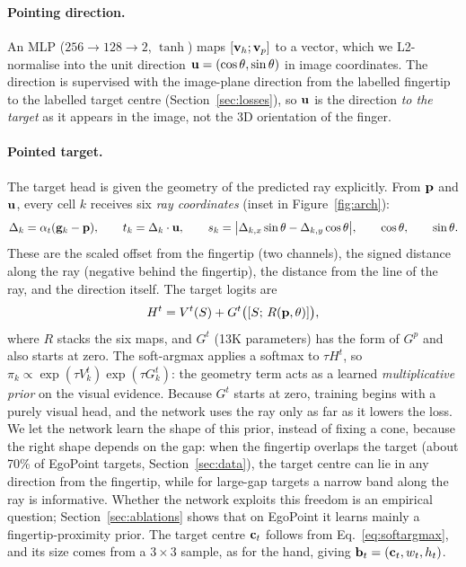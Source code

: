 \paragraph{Pointing direction.} An MLP ($256\to128\to2$, $\tanh$) maps $[\mathbf{v}_h;\mathbf{v}_p]$ to a vector, which we L2-normalise into the unit direction $\mathbf{u}=(\cos\theta,\sin\theta)$ in image coordinates. The direction is supervised with the image-plane direction from the labelled fingertip to the labelled target centre (Section~\ref{sec:losses}), so $\mathbf{u}$ is the direction \emph{to the target} as it appears in the image, not the 3D orientation of the finger.

\paragraph{Pointed target.} The target head is given the geometry of the predicted ray explicitly. From $\mathbf{p}$ and $\mathbf{u}$, every cell $k$ receives six \emph{ray coordinates} (inset in Figure~\ref{fig:arch}):
\begin{equation}
\Delta_k=\alpha_t(\mathbf{g}_k-\mathbf{p}),\qquad
t_k=\Delta_k\cdot\mathbf{u},\qquad
s_k=\big|\Delta_{k,x}\sin\theta-\Delta_{k,y}\cos\theta\big|,\qquad
\cos\theta,\qquad \sin\theta .
\label{eq:raycoords}
\end{equation}
These are the scaled offset from the fingertip (two channels), the signed distance along the ray (negative behind the fingertip), the distance from the line of the ray, and the direction itself. The target logits are
\begin{equation}
H^t = V^t(S) + G^t\big([S;\,R(\mathbf{p},\theta)]\big),
\label{eq:target}
\end{equation}
where $R$ stacks the six maps, and $G^t$ (13K parameters) has the form of $G^p$ and also starts at zero. The soft-argmax applies a softmax to $\tau H^t$, so $\pi_k\propto\exp(\tau V^t_k)\exp(\tau G^t_k)$: the geometry term acts as a learned \emph{multiplicative prior} on the visual evidence. Because $G^t$ starts at zero, training begins with a purely visual head, and the network uses the ray only as far as it lowers the loss. We let the network learn the shape of this prior, instead of fixing a cone, because the right shape depends on the gap: when the fingertip overlaps the target (about 70\% of EgoPoint targets, Section~\ref{sec:data}), the target centre can lie in any direction from the fingertip, while for large-gap targets a narrow band along the ray is informative. Whether the network exploits this freedom is an empirical question; Section~\ref{sec:ablations} shows that on EgoPoint it learns mainly a fingertip-proximity prior. The target centre $\mathbf{c}_t$ follows from Eq.~\eqref{eq:softargmax}, and its size comes from a $3\times3$ sample, as for the hand, giving $\mathbf{b}_t=(\mathbf{c}_t,w_t,h_t)$.

